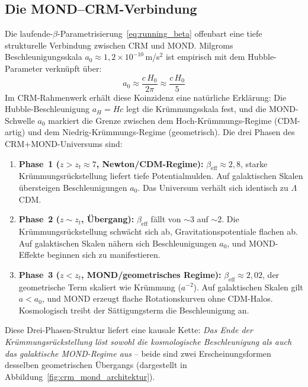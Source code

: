 \documentclass[aps,prd,twocolumn,superscriptaddress,nofootinbib,floatfix]{revtex4-2}
\begin{document}
\subsection{Die MOND--CRM-Verbindung}
\label{subsec:mond_cfm_connection}

Die laufende-$\beta$-Parametrisierung~\eqref{eq:running_beta} offenbart eine tiefe strukturelle Verbindung zwischen CRM und MOND. Milgroms Beschleunigungsskala $a_0 \approx 1{,}2 \times 10^{-10}$\,m/s$^2$ ist empirisch mit dem Hubble-Parameter verknüpft über:
\begin{equation}
a_0 \approx \frac{c\,H_0}{2\pi} \approx \frac{c\,H_0}{5}
\end{equation}
Im CRM-Rahmenwerk erhält diese Koinzidenz eine natürliche Erklärung: Die Hubble-Beschleunigung $a_H = Hc$ legt die Krümmungsskala fest, und die MOND-Schwelle $a_0$ markiert die Grenze zwischen dem Hoch-Krümmungs-Regime (CDM-artig) und dem Niedrig-Krümmungs-Regime (geometrisch). Die drei Phasen des CRM+MOND-Universums sind:

\begin{enumerate}
\item \textbf{Phase~1 ($z > z_t \approx 7$, Newton/CDM-Regime):} $\beta_{\mathrm{eff}} \approx 2{,}8$, starke Krümmungsrückstellung liefert tiefe Potentialmulden. Auf galaktischen Skalen übersteigen Beschleunigungen $a_0$. Das Universum verhält sich identisch zu $\Lambda$CDM.

\item \textbf{Phase~2 ($z \sim z_t$, Übergang):} $\beta_{\mathrm{eff}}$ fällt von $\sim$3 auf $\sim$2. Die Krümmungsrückstellung schwächt sich ab, Gravitationspotentiale flachen ab. Auf galaktischen Skalen nähern sich Beschleunigungen $a_0$, und MOND-Effekte beginnen sich zu manifestieren.

\item \textbf{Phase~3 ($z < z_t$, MOND/geometrisches Regime):} $\beta_{\mathrm{eff}} \approx 2{,}02$, der geometrische Term skaliert wie Krümmung ($a^{-2}$). Auf galaktischen Skalen gilt $a < a_0$, und MOND erzeugt flache Rotationskurven ohne CDM-Halos. Kosmologisch treibt der Sättigungsterm die Beschleunigung an.
\end{enumerate}

Diese Drei-Phasen-Struktur liefert eine kausale Kette: \textit{Das Ende der Krümmungsrückstellung löst sowohl die kosmologische Beschleunigung als auch das galaktische MOND-Regime aus} -- beide sind zwei Erscheinungsformen desselben geometrischen Übergangs (dargestellt in Abbildung~\ref{fig:crm_mond_architektur}).
\end{document}
